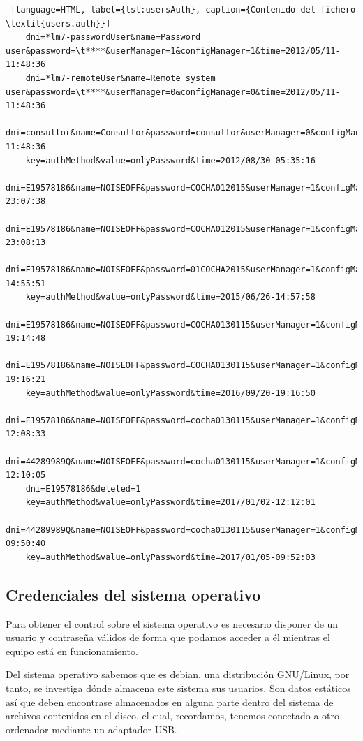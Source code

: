 \begin{lstlisting} [language=HTML, label={lst:usersAuth}, caption={Contenido del fichero \textit{users.auth}}]
    dni=*lm7-passwordUser&name=Password user&password=\t****&userManager=1&configManager=1&time=2012/05/11-11:48:36
    dni=*lm7-remoteUser&name=Remote system user&password=\t****&userManager=0&configManager=0&time=2012/05/11-11:48:36
    dni=consultor&name=Consultor&password=consultor&userManager=0&configManager=0&time=2012/05/11-11:48:36
    key=authMethod&value=onlyPassword&time=2012/08/30-05:35:16
    dni=E19578186&name=NOISEOFF&password=COCHA012015&userManager=1&configManager=1&time=2015/06/25-23:07:38
    dni=E19578186&name=NOISEOFF&password=COCHA012015&userManager=1&configManager=1&time=2015/06/25-23:08:13
    dni=E19578186&name=NOISEOFF&password=01COCHA2015&userManager=1&configManager=1&time=2015/06/26-14:55:51
    key=authMethod&value=onlyPassword&time=2015/06/26-14:57:58
    dni=E19578186&name=NOISEOFF&password=COCHA0130115&userManager=1&configManager=1&time=2016/09/20-19:14:48
    dni=E19578186&name=NOISEOFF&password=COCHA0130115&userManager=1&configManager=1&time=2016/09/20-19:16:21
    key=authMethod&value=onlyPassword&time=2016/09/20-19:16:50
    dni=E19578186&name=NOISEOFF&password=cocha0130115&userManager=1&configManager=1&time=2017/01/02-12:08:33
    dni=44289989Q&name=NOISEOFF&password=cocha0130115&userManager=1&configManager=1&time=2017/01/02-12:10:05
    dni=E19578186&deleted=1
    key=authMethod&value=onlyPassword&time=2017/01/02-12:12:01
    dni=44289989Q&name=NOISEOFF&password=cocha0130115&userManager=1&configManager=1&time=2017/01/05-09:50:40
    key=authMethod&value=onlyPassword&time=2017/01/05-09:52:03
\end{lstlisting}

\subsection{Credenciales del sistema operativo}

Para obtener el control sobre el sistema operativo es necesario disponer de un usuario y contraseña válidos de forma que podamos acceder a él mientras el equipo está en funcionamiento.

Del sistema operativo sabemos que es \gls{debian}, una distribución \gls{GNU/Linux}, por tanto, se investiga dónde almacena este sistema sus usuarios. Son datos estáticos así que deben encontrase almacenados en alguna parte dentro del sistema de archivos contenidos en el disco, el cual, recordamos, tenemos conectado a otro ordenador mediante un adaptador \acrshort{USB}.

